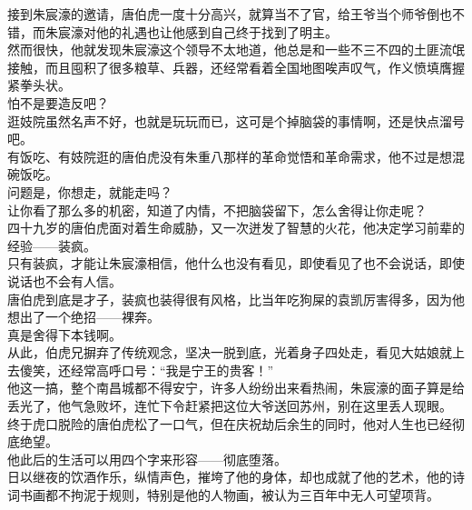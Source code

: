\begin{multicols}{\theparacolNo}
接到朱宸濠的邀请，唐伯虎一度十分高兴，就算当不了官，给王爷当个师爷倒也不错，而朱宸濠对他的礼遇也让他感到自己终于找到了明主。\\

然而很快，他就发现朱宸濠这个领导不太地道，他总是和一些不三不四的土匪流氓接触，而且囤积了很多粮草、兵器，还经常看着全国地图唉声叹气，作义愤填膺握紧拳头状。\\

怕不是要造反吧？\\

逛妓院虽然名声不好，也就是玩玩而已，这可是个掉脑袋的事情啊，还是快点溜号吧。\\

有饭吃、有妓院逛的唐伯虎没有朱重八那样的革命觉悟和革命需求，他不过是想混碗饭吃。\\

问题是，你想走，就能走吗？\\

让你看了那么多的机密，知道了内情，不把脑袋留下，怎么舍得让你走呢？\\

四十九岁的唐伯虎面对着生命威胁，又一次迸发了智慧的火花，他决定学习前辈的经验——装疯。\\

只有装疯，才能让朱宸濠相信，他什么也没有看见，即使看见了也不会说话，即使说话也不会有人信。\\

唐伯虎到底是才子，装疯也装得很有风格，比当年吃狗屎的袁凯厉害得多，因为他想出了一个绝招——裸奔。\\

真是舍得下本钱啊。\\

从此，伯虎兄摒弃了传统观念，坚决一脱到底，光着身子四处走，看见大姑娘就上去傻笑，还经常高呼口号：“我是宁王的贵客！”\\

他这一搞，整个南昌城都不得安宁，许多人纷纷出来看热闹，朱宸濠的面子算是给丢光了，他气急败坏，连忙下令赶紧把这位大爷送回苏州，别在这里丢人现眼。\\

终于虎口脱险的唐伯虎松了一口气，但在庆祝劫后余生的同时，他对人生也已经彻底绝望。\\

他此后的生活可以用四个字来形容——彻底堕落。\\

日以继夜的饮酒作乐，纵情声色，摧垮了他的身体，却也成就了他的艺术，他的诗词书画都不拘泥于规则，特别是他的人物画，被认为三百年中无人可望项背。\\


\end{multicols}
